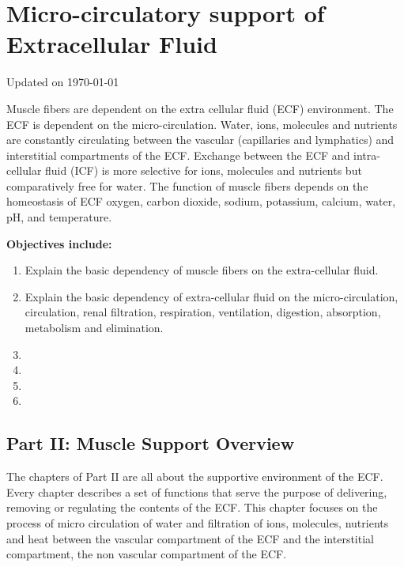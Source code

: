 \chapter{Micro-circulatory support of Extracellular Fluid}\label{chp:ecf_microcirculation}
Updated on \today
\minitoc


Muscle fibers are dependent on the extra cellular fluid (ECF) environment. The ECF is dependent on the micro-circulation. Water, ions, molecules and nutrients are constantly circulating between the vascular (capillaries and lymphatics) and interstitial compartments of the ECF. Exchange between the ECF and intra-cellular fluid (ICF) is more selective for ions, molecules and nutrients but comparatively free for water. The function of muscle fibers depends on the homeostasis of ECF oxygen, carbon dioxide, sodium, potassium, calcium, water, pH, and temperature.

\vspace{5mm}

\textbf{Objectives include:}
\begin{enumerate}
    \item Explain the basic dependency of muscle fibers on the extra-cellular fluid.
    \item Explain the basic dependency of extra-cellular fluid on the micro-circulation, circulation, renal filtration, respiration, ventilation, digestion, absorption, metabolism and elimination.
    \item
    \item
    \item
    \item
\end{enumerate}

\section{Part II: Muscle Support Overview}

The chapters of Part II are all about the supportive environment of the ECF. Every chapter describes a set of functions that serve the purpose of delivering, removing or regulating the contents of the ECF. This chapter focuses on the process of micro circulation of water and filtration of ions, molecules, nutrients and heat between the  vascular compartment of the ECF and the interstitial compartment, the non vascular compartment of the ECF.  

